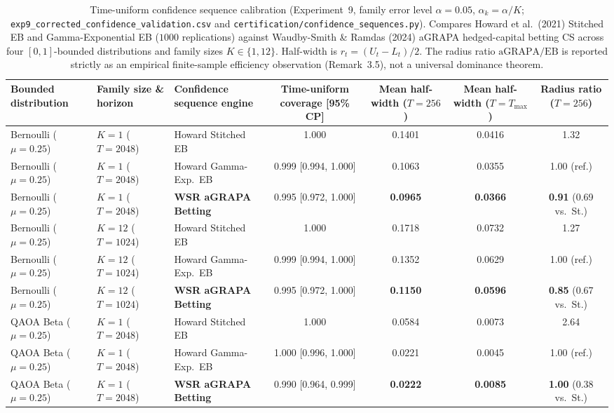 \begin{table}[htbp]
\caption{Time-uniform confidence sequence calibration (Experiment~9, family error level $\alpha=0.05$, $\alpha_k = \alpha/K$; \texttt{exp9\_corrected\_confidence\_validation.csv} and \texttt{certification/confidence\_sequences.py}). Compares Howard et al.\ (2021) Stitched EB and Gamma-Exponential EB ($1000$ replications) against Waudby-Smith \& Ramdas (2024) aGRAPA hedged-capital betting CS across four $[0,1]$-bounded distributions and family sizes $K \in \{1, 12\}$. Half-width is $r_t = (U_t - L_t)/2$. The radius ratio $\mathrm{aGRAPA}/\mathrm{EB}$ is reported strictly as an empirical finite-sample efficiency observation (Remark~3.5), not a universal dominance theorem.}
\label{tab:confidence_validation}
\centering
\scriptsize
\begin{tabular}{@{}l l l c c c c@{}}
\toprule
Bounded distribution & Family size \& horizon & Confidence sequence engine & Time-uniform coverage [95\% CP] & Mean half-width ($T=256$) & Mean half-width ($T=T_{\max}$) & Radius ratio ($T=256$) \\
\midrule
Bernoulli ($\mu=0.25$) & $K=1$ ($T=2048$) & Howard Stitched EB & 1.000 & 0.1401 & 0.0416 & 1.32 \\
Bernoulli ($\mu=0.25$) & $K=1$ ($T=2048$) & Howard Gamma-Exp.\ EB & 0.999 [0.994, 1.000] & 0.1063 & 0.0355 & 1.00 (ref.) \\
Bernoulli ($\mu=0.25$) & $K=1$ ($T=2048$) & \textbf{WSR aGRAPA Betting} & 0.995 [0.972, 1.000] & \textbf{0.0965} & \textbf{0.0366} & \textbf{0.91} (0.69 vs.\ St.) \\
Bernoulli ($\mu=0.25$) & $K=12$ ($T=1024$) & Howard Stitched EB & 1.000 & 0.1718 & 0.0732 & 1.27 \\
Bernoulli ($\mu=0.25$) & $K=12$ ($T=1024$) & Howard Gamma-Exp.\ EB & 0.999 [0.994, 1.000] & 0.1352 & 0.0629 & 1.00 (ref.) \\
Bernoulli ($\mu=0.25$) & $K=12$ ($T=1024$) & \textbf{WSR aGRAPA Betting} & 0.995 [0.972, 1.000] & \textbf{0.1150} & \textbf{0.0596} & \textbf{0.85} (0.67 vs.\ St.) \\
QAOA Beta ($\mu=0.25$) & $K=1$ ($T=2048$) & Howard Stitched EB & 1.000 & 0.0584 & 0.0073 & 2.64 \\
QAOA Beta ($\mu=0.25$) & $K=1$ ($T=2048$) & Howard Gamma-Exp.\ EB & 1.000 [0.996, 1.000] & 0.0221 & 0.0045 & 1.00 (ref.) \\
QAOA Beta ($\mu=0.25$) & $K=1$ ($T=2048$) & \textbf{WSR aGRAPA Betting} & 0.990 [0.964, 0.999] & \textbf{0.0222} & \textbf{0.0085} & \textbf{1.00} (0.38 vs.\ St.) \\

\end{tabular}
\end{table}
